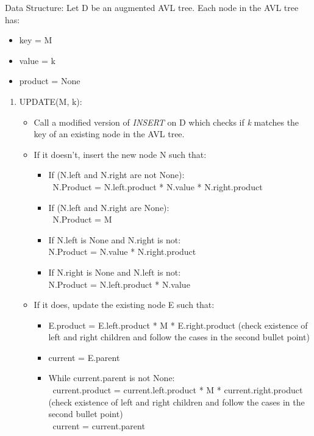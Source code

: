 \documentclass[12pt,twoside]{article}
\begin{document}
\begin{problems}
\begin{problemparts}
\end{problemparts}

\problem

Data Structure: Let D be an augmented AVL tree. Each node in the AVL tree has:

\begin{itemize}
	\item key = M
	\item value = k
	\item product = None
\end{itemize} 

\begin{enumerate}
	\item UPDATE(M, k):
	\begin{itemize}
		\item Call a modified version of \textit{INSERT} on D which checks if \textit{k} matches the key of an existing node in the AVL tree. 
		\item If it doesn't, insert the new node N such that:
		\begin{itemize}
			\item If (N.left and N.right are not None): \\
			 \-\ N.Product = N.left.product * N.value * N.right.product
			\item If (N.left and N.right are None): \\
			 \-\ N.Product = M
			\item If N.left is None and N.right is not:\\
			N.Product = N.value * N.right.product
			\item If N.right is None and N.left is not:\\
			N.Product = N.left.product * N.value	
		\end{itemize}
	\item If it does, update the existing node E such that:
	\begin{itemize}
		\item  E.product = E.left.product * M * E.right.product (check existence of left and right children and follow the cases in the second bullet point)
		\item current = E.parent
		\item While current.parent is not None: \\
		\-\ current.product = current.left.product * M * current.right.product (check existence of left and right children and follow the cases in the second bullet point)\\
		\-\ current = current.parent

\end{itemize}
\end{itemize}
\end{enumerate}
\end{problems}
\end{document}
